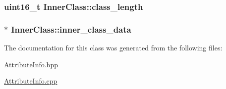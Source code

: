 \subsubsection[{\texorpdfstring{class\+\_\+length}{class_length}}]{\setlength{\rightskip}{0pt plus 5cm}uint16\+\_\+t Inner\+Class\+::class\+\_\+length}\hypertarget{class_inner_class_a7976c7530d97d879907ce035a9b7d2c7}{}\label{class_inner_class_a7976c7530d97d879907ce035a9b7d2c7}
\subsubsection[{\texorpdfstring{inner\+\_\+class\+\_\+data}{inner_class_data}}]{$\ast$ Inner\+Class\+::inner\+\_\+class\+\_\+data}\hypertarget{class_inner_class_ad9876452a134d1d5063223610dae7d6a}{}\label{class_inner_class_ad9876452a134d1d5063223610dae7d6a}


The documentation for this class was generated from the following files\+:\begin{DoxyCompactItemize}
\item 
\hyperlink{_attribute_info_8hpp}{Attribute\+Info.\+hpp}\item 
\hyperlink{_attribute_info_8cpp}{Attribute\+Info.\+cpp}\end{DoxyCompactItemize}
